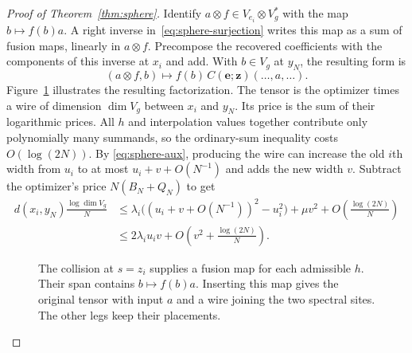 \begin{proof}[Proof of Theorem~\ref{thm:sphere}]
Identify \(a\otimes f\in V_{e_i}\otimes V_g^*\) with the map
\(b\mapsto f(b)a\). A right inverse in~\eqref{eq:sphere-surjection}
writes this map as a sum of fusion maps, linearly in \(a\otimes f\).
Precompose the recovered coefficients with the components of this
inverse at \(x_i\) and add. With \(b\in V_g\) at \(y_N\), the resulting
form is
\[
 (a\otimes f,b)\longmapsto f(b)\,
             C(\mathbf e;\mathbf z)(\ldots,a,\ldots).
\]
Figure~\ref{fig:sphere-wire} illustrates the resulting factorization.
The tensor is the optimizer times a wire of dimension \(\dim V_g\)
between \(x_i\) and \(y_N\). Its price is the sum of their logarithmic
prices.
All \(h\) and interpolation values together contribute only polynomially
many summands, so the ordinary-sum inequality costs \(O(\log(2N))\).
By \eqref{eq:sphere-aux}, producing the wire can increase the old
\(i\)th width from \(u_i\) to at most \(u_i+v+O(N^{-1})\) and adds the
new width \(v\). Subtract the optimizer's price \(N(B_N+Q_N)\) to get
\begin{align*}
 d(x_i,y_N)\frac{\log\dim V_g}{N}
 &\le \lambda_i\bigl((u_i+v+O(N^{-1}))^2-u_i^2\bigr)
           +\mu v^2+O\!\left(\frac{\log(2N)}{N}\right)\\
 &\le 2\lambda_i u_i v+O\!\left(v^2+\frac{\log(2N)}{N}\right).
\end{align*}

\begin{figure}[tbp]
\centering
{}
\caption{The collision at \(s=z_i\) supplies a fusion map for each
admissible \(h\). Their span contains \(b\mapsto f(b)a\).
Inserting this map gives the original tensor with input \(a\) and a
wire joining the two spectral sites. The other legs keep their
placements.}\label{fig:sphere-wire}
\end{figure}


\end{proof}
